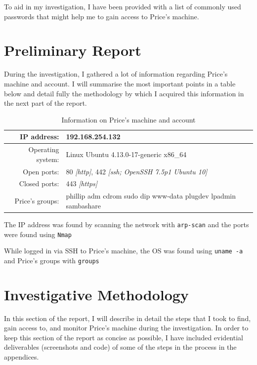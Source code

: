 \documentclass[12pt]{report}
\newcommand{\term}[1]{\colorbox{light-gray}{\texttt{#1}}}
\begin{document}
To aid in my investigation, I have been provided with a list of commonly used passwords that might help me to gain access to Price's machine.


\pagebreak
\chapter{Preliminary Report}
During the investigation, I gathered a lot of information regarding Price's machine and account. I will summarise the most important points in a table below and detail fully the methodology by which I acquired this information in the next part of the report.

\begin{table}[h!]
  \centering
  \begin{tabular}{|r l|}
    \hline
    IP address: & 192.168.254.132 \\
    \hline
    Operating system: & Linux Ubuntu 4.13.0-17-generic x86\_64 \\
    \hline
    Open ports: & 80 \textit{[http]}, 442 \textit{[ssh; OpenSSH 7.5p1 Ubuntu 10]} \\
    \hline
    Closed ports: & 443 \textit{[https]} \\
    \hline
    Price's groups: & phillip adm cdrom sudo dip www-data plugdev lpadmin sambashare \\
    \hline
  \end{tabular}
  \caption{Information on Price's machine and account}
  \label{table:pricemachineinfo}
\end{table}

The IP address was found by scanning the network with \texttt{arp-scan} and the ports were found using \texttt{Nmap}

While logged in via SSH to Price's machine, the OS was found using \term{uname -a} and Price's groups with \term{groups}


\pagebreak
\chapter{Investigative Methodology}
In this section of the report, I will describe in detail the steps that I took to find, gain access to, and monitor Price's machine during the investigation. In order to keep this section of the report as concise as possible, I have included evidential deliverables (screenshots and code) of some of the steps in the process in the appendices.
\end{document}
